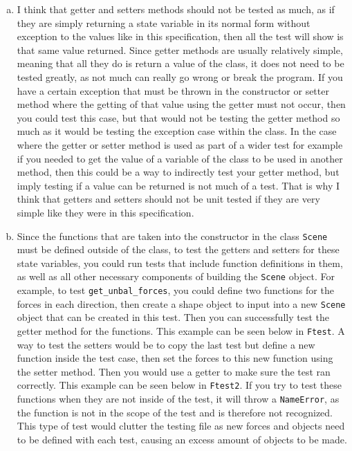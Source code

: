 \documentclass[12pt]{article}
\begin{document}
\begin{enumerate}[a)]

\item I think that getter and setters methods should not be tested as much, as if they are simply
returning a state variable in its normal form without exception to the values like in this 
specification, then all the test will show is that same value returned. Since getter methods are 
usually relatively simple, meaning that all they do is return a value of the class, it does not 
need to be tested greatly, as not much can really go wrong or break the program. If you have a 
certain exception that must be thrown in the constructor or setter method where the getting of 
that value using the getter must not occur, then you could test this case, but that would not be 
testing the getter method so much as it would be testing the exception case within the class. In 
the case where the getter or setter method is used as part of a wider test for example if you 
needed to get the value of a variable of the class to be used in another method, then this could 
be a way to indirectly test your getter method, but imply testing if a value can be returned is 
not much of a test. That is why I think that getters and setters should not be unit tested if 
they are very simple like they were in this specification. 

\item Since the functions that are taken into the constructor in the class \verb|Scene| must be 
defined outside of the class, to test the getters and setters for these state variables, you 
could run tests that include function definitions in them, as well as all other necessary 
components of building the \verb|Scene| object. For example, to test \verb|get_unbal_forces|, you 
could define two functions for the forces in each direction, then create a shape object to input 
into a new \verb|Scene| object that can be created in this test. Then you can successfully test 
the getter method for the functions. This example can be seen below in \verb|Ftest|. A way to 
test the setters would be to copy the last test but define a new function inside the test case, 
then set the forces to this new function using the setter method. Then you would use a getter to 
make sure the test ran correctly. This example can be seen below in \verb|Ftest2|. If you try to 
test these functions when they are not inside of the test, it will throw a \verb|NameError|, as 
the function is not in the scope of the test and is therefore not recognized. This type of test 
would clutter the testing file as new forces and objects need to be defined with each test, 
causing an excess amount of objects to be made. 


\end{enumerate}
\end{document}
